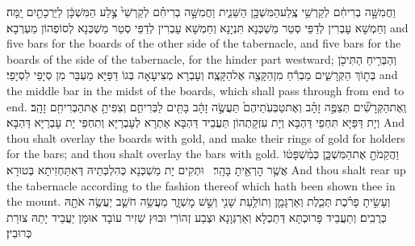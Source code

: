 {וַחֲמִשָּׁ֣ה בְרִיחִ֔ם לְקַרְשֵׁ֥י צֶֽלַע\maqqaf הַמִּשְׁכָּ֖ן הַשֵּׁנִ֑ית וַחֲמִשָּׁ֣ה בְרִיחִ֗ם לְקַרְשֵׁי֙ צֶ֣לַע הַמִּשְׁכָּ֔ן לַיַּרְכָתַ֖יִם יָֽמָּה׃}
{וְחַמְשָׁא עָבְרִין לְדַפֵּי סְטַר מַשְׁכְּנָא תִּנְיָנָא וְחַמְשָׁא עָבְרִין לְדַפֵּי סְטַר מַשְׁכְּנָא לְסוֹפְהוֹן מַעְרְבָא׃}
{and five bars for the boards of the other side of the tabernacle, and five bars for the boards of the side of the tabernacle, for the hinder part westward;}{}
{וְהַבְּרִ֥יחַ הַתִּיכֹ֖ן בְּת֣וֹךְ הַקְּרָשִׁ֑ים מַבְרִ֕חַ מִן\maqqaf הַקָּצֶ֖ה אֶל\maqqaf הַקָּצֶֽה׃}
{וְעָבְרָא מְצִיעָאָה בְּגוֹ דַּפַּיָּא מַעְבַּר מִן סְיָפֵי לִסְיָפֵי׃}
{and the middle bar in the midst of the boards, which shall pass through from end to end.}{}
{וְֽאֶת\maqqaf הַקְּרָשִׁ֞ים תְּצַפֶּ֣ה זָהָ֗ב וְאֶת\maqqaf טַבְּעֹֽתֵיהֶם֙ תַּעֲשֶׂ֣ה זָהָ֔ב בָּתִּ֖ים לַבְּרִיחִ֑ם וְצִפִּיתָ֥ אֶת\maqqaf הַבְּרִיחִ֖ם זָהָֽב׃}
{וְיָת דַּפַּיָּא תִּחְפֵי דַּהְבָּא וְיָת עִזְקָתְהוֹן תַּעֲבֵיד דַּהְבָּא אַתְרָא לְעָבְרַיָּא וְתִחְפֵי יָת עָבְרַיָּא דַּהְבָּא׃}
{And thou shalt overlay the boards with gold, and make their rings of gold for holders for the bars; and thou shalt overlay the bars with gold.}{}
{וַהֲקֵמֹתָ֖ אֶת\maqqaf הַמִּשְׁכָּ֑ן כְּמִ֨שְׁפָּט֔וֹ אֲשֶׁ֥ר הׇרְאֵ֖יתָ בָּהָֽר׃ \setuma }
{וּתְקִים יָת מַשְׁכְּנָא כְּהִלְכְּתֵיהּ דְּאִתַּחְזִיתָא בְּטוּרָא׃}
{And thou shalt rear up the tabernacle according to the fashion thereof which hath been shown thee in the mount.}{}
{וְעָשִׂ֣יתָ פָרֹ֗כֶת תְּכֵ֧לֶת וְאַרְגָּמָ֛ן וְתוֹלַ֥עַת שָׁנִ֖י וְשֵׁ֣שׁ מׇשְׁזָ֑ר מַעֲשֵׂ֥ה חֹשֵׁ֛ב יַעֲשֶׂ֥ה אֹתָ֖הּ כְּרֻבִֽים׃}
{וְתַעֲבֵיד פָּרוּכְתָּא דְּתַכְלָא וְאַרְגְּוָנָא וּצְבַע זְהוֹרִי וּבוּץ שְׁזִיר עוֹבָד אוּמָּן יַעֲבֵיד יָתַהּ צוּרַת כְּרוּבִין׃}
